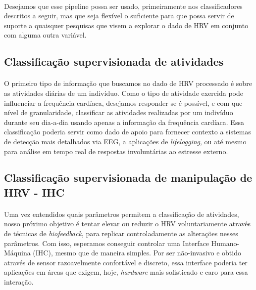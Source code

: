             \paragraph{} Desejamos que esse pipeline possa ser usado, primeiramente nos classificadores descritos a seguir, mas que seja flexível o suficiente para que possa servir de suporte a quaisquer pesquisas que visem a  explorar o dado de HRV em conjunto com alguma outra variável.
        
        \subsection{Classificação supervisionada de atividades}
        
            \paragraph{} O primeiro tipo de informação que buscamos no dado de HRV processado é sobre as atividades diárias de um indivíduo. Como o tipo de atividade exercida pode influenciar a frequência cardíaca, desejamos responder se é possível, e com que nível de granularidade, classificar as atividades realizadas por um indivíduo durante seu dia-a-dia usando apenas a informação da frequência cardíaca. Essa classificação poderia servir como dado de apoio para fornecer contexto a sistemas de detecção mais detalhados via EEG, a aplicações de \textit{lifelogging}, ou até mesmo para análise em tempo real de respostas involuntárias ao estresse externo.
       
        \subsection{Classificação supervisionada de manipulação de HRV - IHC}
            
            \paragraph{} Uma vez entendidos quais parâmetros permitem a classificação de atividades, nosso próximo objetivo é tentar elevar ou reduzir o HRV voluntariamente através de técnicas de \textit{biofeedback}, para replicar controladamente as alterações nesses parâmetros. Com isso, esperamos conseguir controlar uma Interface Humano-Máquina (IHC), mesmo que de maneira simples. Por ser não-invasivo e obtido através de sensor razoavelmente confortável e discreto, essa interface poderia ter aplicações em áreas que exigem, hoje, \textit{hardware} mais sofisticado e caro para essa interação.


